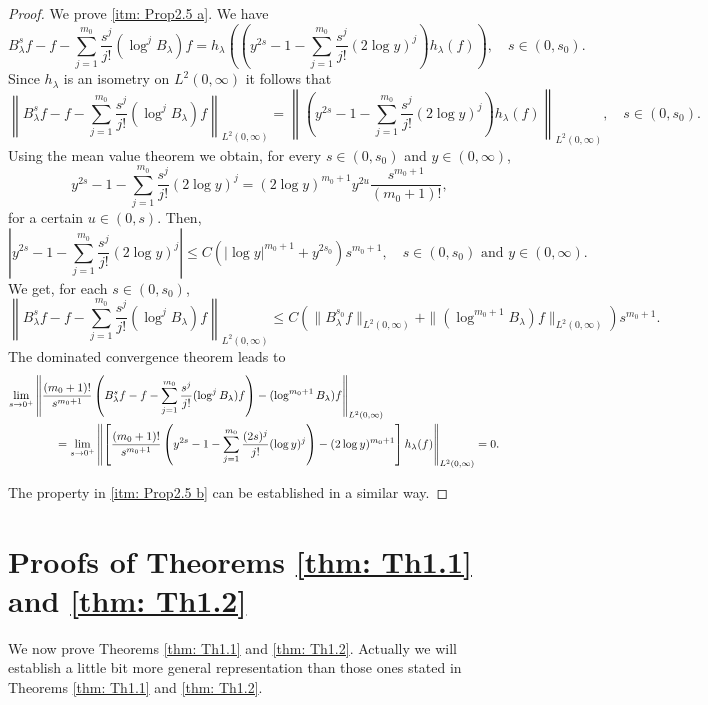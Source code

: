 \documentclass[a4paper,10pt, reqno]{amsart}
\theoremstyle{definition}
\theoremstyle{remark}
\numberwithin{equation}{section}
\begin{document}
\begin{proof}
    We prove \ref{itm: Prop2.5 a}. We have
    \[
     B_\lambda^sf-f-\sum_{j=1}^{m_0}\frac{s^j}{j!}(\log^jB_\lambda)f=h_\lambda \left(\left(y^{2s}
     -1-\sum_{j=1}^{m_0}\frac{s^j}{j!}(2\log y)^j\right)h_\lambda (f)\right),\quad s\in (0,s_0).
    \]
    Since $h_\lambda$ is an isometry on $L^2(0,\infty)$ it follows that
    \[
    \left\|B_\lambda^sf-f-\sum_{j=1}^{m_0}\frac{s^j}{j!}(\log^jB_\lambda)f\right\|_{L^2(0,\infty)}=\left\|\left(y^{2s}
     -1-\sum_{j=1}^{m_0}\frac{s^j}{j!}(2\log y)^j\right)h_\lambda (f)\right\|_{L^2(0,\infty)},\quad s\in (0,s_0).
    \]
 Using the mean value theorem we obtain, for every $s\in (0,s_0)$ and $y\in (0,\infty)$,
    \[
    y^{2s}-1-\sum_{j=1}^{m_0}\frac{s^j}{j!}(2\log y)^j=(2\log y)^{m_0+1}y^{2u}\frac{s^{m_0+1}}{(m_0+1)!},
    \]
     for a certain $u\in (0,s)$. Then,
     \[
     \left|y^{2s}-1-\sum_{j=1}^{m_0}\frac{s^j}{j!}(2\log y)^j\right|\leq C\left(|\log y|^{m_0+1}+y^{2s_0}\right)s^{m_0+1},\quad s\in (0,s_0)\mbox{ and }y\in (0,\infty).
     \]
     We get, for each $s\in (0,s_0)$,
     \[
     \left\|B_\lambda^sf-f-\sum_{j=1}^{m_0}\frac{s^j}{j!}(\log^jB_\lambda)f\right\|_{L^2(0,\infty)}\leq C\left(\|B_\lambda^{s_0}f\|_{L^2(0,\infty)}+\|(\log^{m_0+1}B_\lambda)f\|_{L^2(0,\infty)}\right)s^{m_0+1}.
     \]
     The dominated convergence theorem leads to 
     \begin{align*}
         \lim_{s\rightarrow 0^+}\left\|\frac{(m_0+1)!}{s^{m_0+1}}\left(B_\lambda^sf-f-\sum_{j=1}^{m_0}\frac{s^j}{j!}(\log^jB_\lambda)f\right)-(\log^{m_0+1}B_\lambda)f\right\|_{L^2(0,\infty)}\\
         &\hspace{-10cm}=\lim_{s\rightarrow 0^+}\left\|\left[\frac{(m_0+1)!}{s^{m_0+1}}\left(y^{2s}-1-\sum_{j=1}^{m_0}\frac{(2s)^j}{j!}(\log y)^j\right)-(2\log y)^{m_0+1}\right]h_\lambda (f)\right\|_{L^2(0,\infty)}=0.
     \end{align*}

     The property in \ref{itm: Prop2.5 b} can be established in a similar way.
\end{proof}


\section{Proofs of Theorems \ref{thm: Th1.1} and \ref{thm: Th1.2}}\label{sec: proofs Th1.1 Th1.2}

We now prove Theorems \ref{thm: Th1.1} and \ref{thm: Th1.2}. Actually we will establish a little bit more general representation than those ones stated in Theorems \ref{thm: Th1.1} and \ref{thm: Th1.2}.
\end{document}
